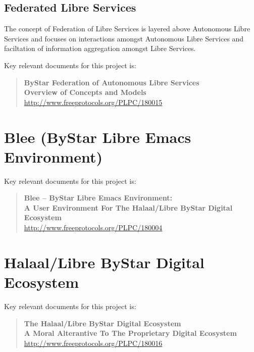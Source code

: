 
\subsection{Federated Libre Services}

The concept of Federation of Libre Services is layered above Autonomous Libre Services and
focuses on interactions amongst Autonomous Libre Services and faciltation of information
aggregation amongst Libre Services.

Key relevant documents for this project is:
\begin{quote}
  \textbf{ByStar Federation of Autonomous Libre Services}\\
  \textbf{Overview of Concepts and Models}\\
  \href{http://www.freeprotocols.org/PLPC/180015}{http://www.freeprotocols.org/PLPC/180015}
\end{quote}

\section{Blee (ByStar Libre Emacs Environment)}

Key relevant documents for this project is:

\begin{quote}
  \textbf{Blee -- ByStar Libre Emacs Environment:}\\
  \textbf{A User Environment For The Halaal/Libre ByStar Digital Ecosystem}\\
  \href{http://www.freeprotocols.org/PLPC/180004}{http://www.freeprotocols.org/PLPC/180004}
\end{quote}

\section{Halaal/Libre ByStar Digital Ecosystem}

Key relevant documents for this project is:

\begin{quote}
  \textbf{The Halaal/Libre ByStar Digital Ecosystem}\\
  \textbf{A Moral Alterantive To The Proprietary Digital Ecosystem}\\
  \href{http://www.freeprotocols.org/PLPC/180016}{http://www.freeprotocols.org/PLPC/180016}
\end{quote}

